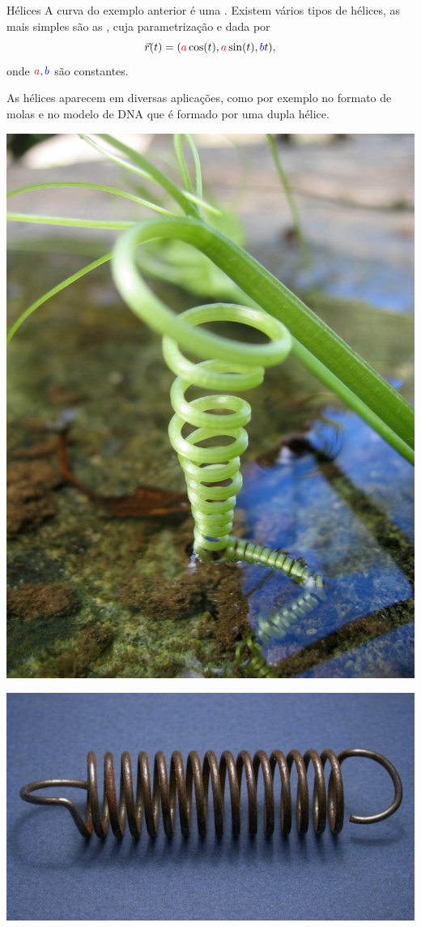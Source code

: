 \begin{frame}[label=fun-vet]
\begin{block}{Hélices}
A curva do exemplo anterior é uma . Existem vários tipos de hélices, as mais simples são as , cuja  parametrização e dada por 
\[\vec{r}(t)=({\color{red}a}\cos(t),{\color{red}a}\sin(t),{\color{blue}b}t),\]
onde ${\color{red}a},{\color{blue}b}$ são constantes.

As hélices aparecem em diversas aplicações, como por exemplo no formato de molas e no modelo de DNA que é formado por uma dupla hélice.
\end{block}
\begin{minipage}{0.3\textwidth}
\includegraphics[scale=0.1]{figuras/DirkvdM_natural_spiral.jpg}
\end{minipage}
\begin{minipage}{0.35\textwidth}
\includegraphics[scale=.7]{figuras/mola.jpg}

\end{minipage}
\end{frame}
